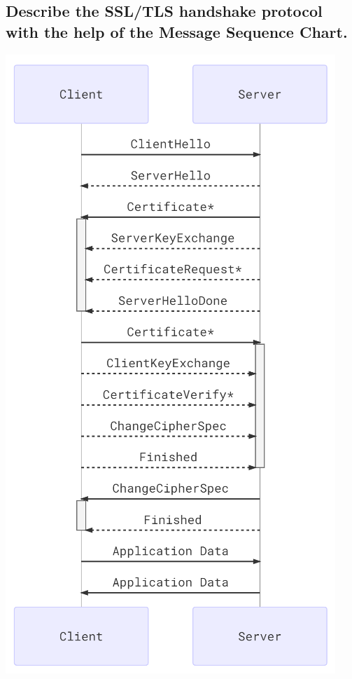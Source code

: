 \documentclass[9pt, letterpaper]{article}
\begin{document}
\subsection{Describe the SSL/TLS handshake protocol with the help of the Message Sequence Chart.}
\begin{center}
\includegraphics[scale=0.5]{SSLHandshake.png}
\end{center}
\end{document}
